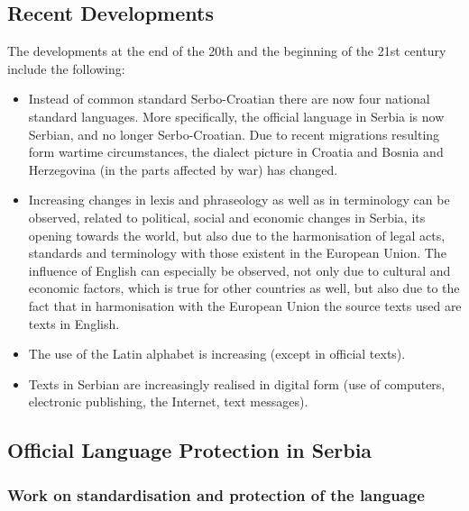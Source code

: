 \begin{multicols}{2}


\subsection{Recent Developments}


The developments at the end of the 20th and the beginning of the 21st century include the following:
\begin{itemize}
 \item Instead of common standard Serbo-Croatian there are now four national standard languages. More specifically, the official language in Serbia is now Serbian, and no longer Serbo-Croatian.  Due to recent migrations resulting form wartime circumstances, the dialect picture in Croatia and Bosnia and Herzegovina (in the parts affected by war) has changed. 
\item Increasing changes in lexis and phraseology as well as in terminology can be observed, related to political, social and economic changes in Serbia, its opening towards the world, but also due to the harmonisation of legal acts, standards and terminology with those existent in the European Union. The influence of English can especially be observed, not only due to cultural and economic factors, which is true for other countries as well, but also due to the fact that in harmonisation with the European Union the source texts used are texts in English. 
\item The use of the Latin alphabet is increasing (except in official texts). 
\item Texts in Serbian are increasingly realised in digital form (use of computers, electronic publishing, the Internet, text messages). 
\end{itemize}

\subsection {Official Language Protection in Serbia}

\subsubsection{Work on standardisation and protection of the language}   


\end{multicols}
